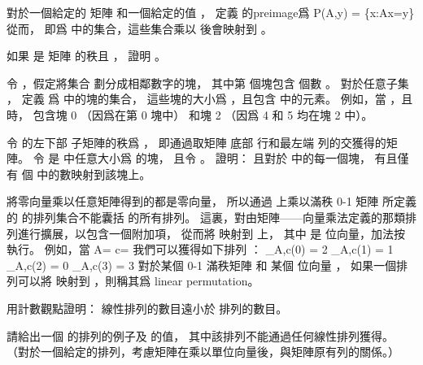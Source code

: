 \startANSWER
{}
\stopANSWER

對於一個給定的  矩陣  和一個給定的值 ，
定義  的{\EMP preimage}爲
\startformula
P(A,y) = \{x:Ax=y\}
\stopformula
從而，  即爲  中的集合，這些集合乘以  後會映射到 。

\startigBase[continue]\startitem
如果  是  矩陣  的秩且 ，
證明 。
\stopitem\stopigBase

\startANSWER
{}
\stopANSWER

令 ，假定將集合  劃分成相鄰數字的塊，
其中第  個塊包含  個數 。
對於任意子集 ，
定義  爲  中的塊的集合，
這些塊的大小爲 ，且包含  中的元素。
例如，當 ，且  時，
  包含塊 0 （因爲在第 0 塊中）
和塊 2 （因爲 4 和 5 均在塊 2 中）。

\startigBase[continue]\startitem
令  的左下部  子矩陣的秩爲 ，
即通過取矩陣  底部  行和最左端  列的交獲得的矩陣。
令  是  中任意大小爲  的塊，
且令 。
證明：  且對於  中的每一個塊，
有且僅有  個  中的數映射到該塊上。
\stopitem\stopigBase

\startANSWER
{}
\stopANSWER

將零向量乘以任意矩陣得到的都是零向量，
所以通過  上乘以滿秩  0-1 矩陣
所定義的  的排列集合不能囊括  的所有排列。
這裏，對由矩陣——向量乘法定義的那類排列進行擴展，以包含一個附加項，
從而將  映射到  上，
其中  是  位向量，加法按  執行。
例如，當
\startformulas
\startformula
A=\left[\startmatrix
\NC 1 \NC 0 \NR
\NC 1 \NC 1 \NR
\stopmatrix\right]
\stopformula
\startformula
c=\left[\startmatrix
\NC 0 \NR
\NC 1 \NR
\stopmatrix\right]
\stopformula
\stopformulas
我們可以獲得如下排列 ：
\startformulas
\startformula\startmathalignment[n=1]
\NC \pi_{A,c}(0) = 2 \NR
\NC \pi_{A,c}(1) = 1 \NR
\stopmathalignment\stopformula
\startformula\startmathalignment[n=1]
\NC \pi_{A,c}(2) = 0 \NR
\NC \pi_{A,c}(3) = 3 \NR
\stopmathalignment\stopformula
\stopformulas
對於某個  0-1 滿秩矩陣  和 某個  位向量 ，
如果一個排列可以將  映射到 ，則稱其爲 {\EMP linear permutation}。

\startigBase[continue]\startitem
用計數觀點證明：
  線性排列的數目遠小於  排列的數目。
\stopitem\stopigBase

\startANSWER
{}
\stopANSWER

\startigBase[continue]\startitem
請給出一個  的排列的例子及  的值，
其中該排列不能通過任何線性排列獲得。
（\hint 對於一個給定的排列，考慮矩陣在乘以單位向量後，與矩陣原有列的關係。）
\stopitem\stopigBase

\startANSWER
{}
\stopANSWER
\stopPROBLEM

\stopsubject%
